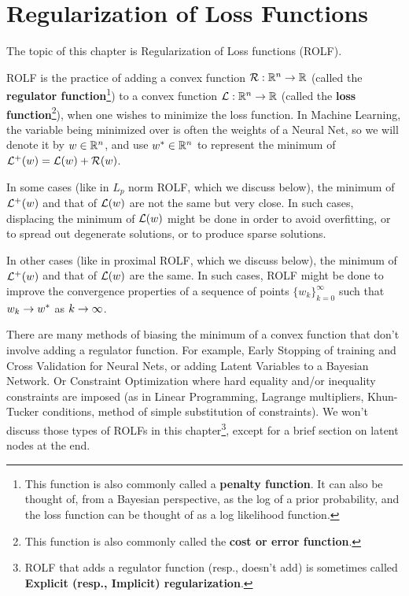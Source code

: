 \chapter{Regularization of Loss Functions}
\label{ch-regularization}


 The topic
 of this chapter is Regularization of Loss functions (ROLF).

ROLF is the practice of adding 
a convex function  ${\cal R}:{ \mathbb{R}}^n\rightarrow { \mathbb{R}}$
(called the {\bf regulator function}\footnote{This function is also commonly called a {\bf penalty function}.
It can  also be thought  of, from a Bayesian perspective,
as the log of a prior probability, and the loss function can be thought of as a log likelihood function.}) to
a convex function  ${\cal L}:{ \mathbb{R}}^n\rightarrow { \mathbb{R}}$
(called the {\bf  loss function}\footnote{This function is also commonly
called the {\bf cost or error function}.}), when one
wishes to minimize the loss function. In Machine Learning,
the variable being minimized over is often the weights 
of a Neural Net, so we will denote it by $w\in { \mathbb{R}}^n$, and use $w^*\in { \mathbb{R}}^n$
to represent the
minimum of ${\cal L}^+(w) ={\cal L}(w)+ {\cal R}(w)$. 

In some cases (like in $L_p$ norm ROLF,
which we discuss below),
the minimum of ${\cal L}^+(w)$
and that of ${\cal L}(w)$
are not the same but very close. In such cases,
displacing the minimum of 
${\cal L}(w)$ 
might be done in order
to avoid overfitting, or
to spread out degenerate solutions, or to produce
sparse solutions. 

In other cases (like in proximal ROLF, which we discuss below),
the minimum of ${\cal L}^+(w)$
and that of ${\cal L}(w)$
are the  same. 
In such cases, ROLF might be done
to improve the
convergence properties
of a sequence of points
$\{w_k\}_{k=0}^\infty$
such that $w_k\rightarrow w^*$
as $k
\rightarrow \infty$.

There are many methods
of biasing the 
minimum of a convex function that  don't
involve adding a regulator
function.
For example, Early Stopping
of training 
and Cross Validation for Neural Nets,
or adding Latent Variables
to a Bayesian Network.
Or Constraint Optimization where hard equality and/or inequality constraints are imposed (as in Linear Programming,
Lagrange multipliers, Khun-Tucker conditions, method of simple substitution of constraints).
We won't discuss those types of
ROLFs in this chapter\footnote{ROLF that adds a regulator function (resp., doesn't add)
is sometimes called {\bf Explicit (resp., Implicit)
regularization}.}, except for a brief section on latent nodes at the end.



